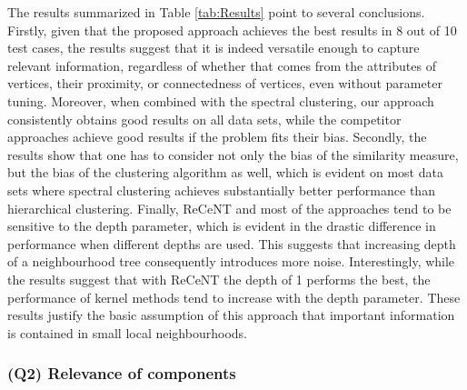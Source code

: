 The results summarized in Table \ref{tab:Results} point to several conclusions.
Firstly, given that the proposed approach achieves the best results in 8 out of 10 test cases, the results suggest that it is indeed versatile enough to capture relevant information, regardless of whether  that comes from the attributes of vertices, their proximity, or connectedness  of vertices, even without parameter tuning.
Moreover, when combined with the spectral clustering, our approach consistently obtains good results on all data sets, while the competitor approaches achieve good results if the problem fits their bias.
Secondly, the results show that one has to consider not only the bias of the similarity measure, but the bias of the clustering algorithm as well, which is evident on most data sets where spectral clustering achieves substantially better performance than hierarchical clustering.
Finally, ReCeNT and most of the approaches tend to be sensitive to the depth parameter, which is evident in the drastic difference in performance when different depths are used.
This suggests that increasing depth of a neighbourhood tree consequently introduces more noise.
Interestingly, while the results suggest that with ReCeNT the depth of 1 performs the best, the performance of kernel methods tend to increase with the depth parameter.
These results justify the basic assumption of this approach that important information is contained in small local neighbourhoods.
\vspace{2pt}










\subsubsection{\textbf{(Q2) Relevance of components}}

